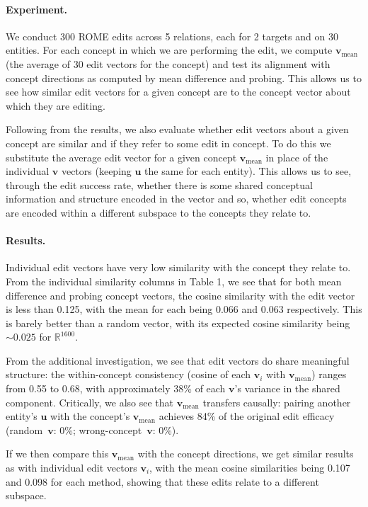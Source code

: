 \documentclass[11pt,a4paper]{article}
\newcommand{\vv}{\mathbf{v}}
\newcommand{\uu}{\mathbf{u}}
\begin{document}
\paragraph{Experiment.}
We conduct 300 ROME edits across 5 relations, each for 2 targets and on 30 entities.
For each concept in which we are performing the edit, we compute $\vv_\text{mean}$ (the average of 30 edit vectors for the concept) and test its alignment with concept directions as computed by mean difference and probing. This allows us to see how similar edit vectors for a given concept are to the concept vector about which they are editing. 

Following from the results, we also evaluate whether edit vectors about a given concept are similar and if they refer to some edit in concept. To do this we substitute the average edit vector for a given concept $\vv_\text{mean}$ in place of the individual $\vv$ vectors (keeping $\uu$ the same for each entity). This allows us to see, through the edit success rate, whether there is some shared conceptual information and structure encoded in the vector and so, whether edit concepts are encoded within a different subspace to the concepts they relate to.

\paragraph{Results.}
Individual edit vectors have very low similarity with the concept they relate to. From the individual similarity columns in Table 1, we see that for both mean difference and probing concept vectors, the cosine similarity with the edit vector is less than 0.125, with the mean for each being 0.066 and 0.063 respectively. This is barely better than a random vector, with its expected cosine similarity being $\sim 0.025$ for $\mathbb{R}^{1600}$.

From the additional investigation, we see that edit vectors do share meaningful structure: the within-concept consistency (cosine of each $\vv_i$ with $\vv_\text{mean}$) ranges from 0.55 to 0.68, with approximately 38\% of each $\vv$'s variance in the shared component.
Critically, we also see that $\vv_\text{mean}$ transfers causally: pairing another entity's $\uu$ with the concept's $\vv_\text{mean}$ achieves 84\% of the original edit efficacy (random~$\vv$: 0\%; wrong-concept~$\vv$: 0\%).

If we then compare this $\vv_\text{mean}$ with the concept directions, we get similar results as with individual edit vectors $\vv_i$, with the mean cosine similarities being 0.107 and 0.098 for each method, showing that these edits relate to a different subspace.
\end{document}
